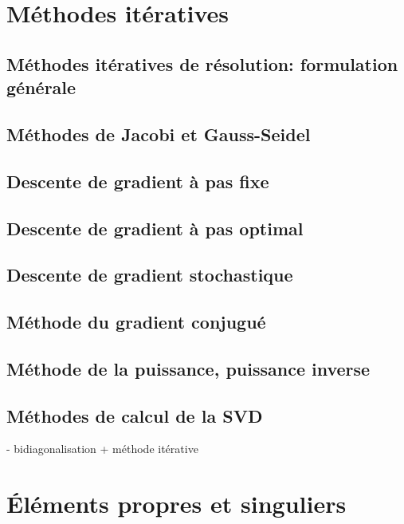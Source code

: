 \section{Méthodes itératives}

\subsection{Méthodes itératives de résolution: formulation générale}

\subsection{Méthodes de Jacobi et Gauss-Seidel}

\subsection{Descente de gradient à pas fixe}

\subsection{Descente de gradient à pas optimal}

\subsection{Descente de gradient stochastique}

\subsection{Méthode du gradient conjugué}

\subsection{Méthode de la puissance, puissance inverse}

\subsection{Méthodes de calcul de la SVD}

- bidiagonalisation + méthode itérative




\section{Éléments propres et singuliers}

